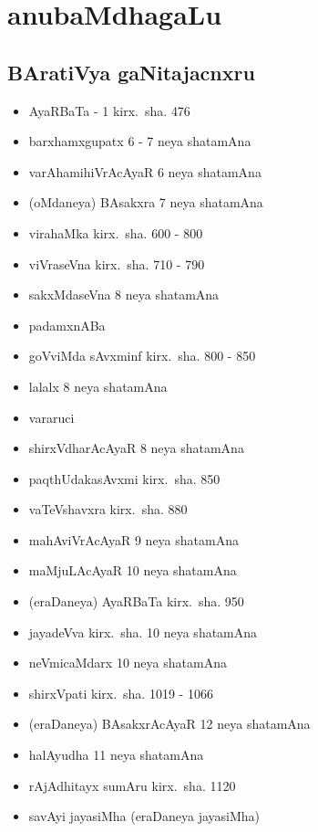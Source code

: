 \chapter{anubaMdhagaLu} 

\section*{BAratiVya gaNitajacnxru}

{\renewcommand\labelitemi{}
\begin{itemize}
\item AyaRBaTa - {\rm 1} kirx.~sha. {\rm 476}
\item barxhamxgupatx {\rm 6 - 7} neya shatamAna
\item varAhamihiVrAcAyaR {\rm 6} neya shatamAna
\item (oMdaneya) BAsakxra {\rm 7} neya shatamAna
\item virahaMka kirx.~sha. {\rm 600 - 800}
\item viVraseVna kirx.~sha. {\rm 710 - 790}
\item sakxMdaseVna {\rm 8} neya shatamAna
\item padamxnABa
\item goVviMda sAvxminf kirx.~sha. {\rm 800 - 850}
\item lalalx {\rm 8} neya shatamAna
\item vararuci
\item shirxVdharAcAyaR {\rm 8} neya shatamAna
\item paqthUdakasAvxmi kirx.~sha. {\rm 850}
\item vaTeVshavxra kirx.~sha. {\rm 880}
\item mahAviVrAcAyaR {\rm 9} neya shatamAna
\item maMjuLAcAyaR {\rm 10} neya shatamAna
\item (eraDaneya) AyaRBaTa kirx.~sha. {\rm 950}
\item  jayadeVva kirx.~sha. {\rm 10} neya shatamAna
\item neVmicaMdarx {\rm 10} neya shatamAna
\item shirxVpati kirx.~sha. {\rm 1019 - 1066}
\item (eraDaneya) BAsakxrAcAyaR {\rm 12} neya shatamAna
\item halAyudha {\rm 11} neya shatamAna
\item rAjAdhitayx sumAru kirx.~sha. {\rm 1120}
\item savAyi jayasiMha (eraDaneya jayasiMha)

\end{itemize}}
